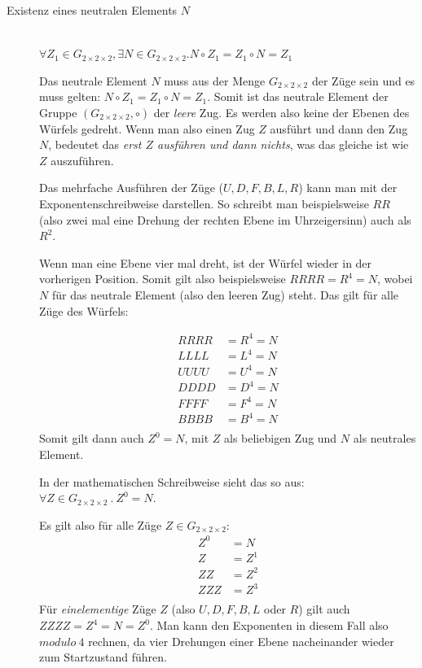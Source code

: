 \documentclass[12pt,a4paper, usenames, dvipsnames]{article}
\newcommand{\Gtwo}{\ensuremath{G_{2\times 2\times 2}}}
\begin{document}
\begin{description}
\item [Existenz eines neutralen Elements $N$] \ \\
$\forall Z_1 \in \Gtwo, \exists N \in \Gtwo.N \circ Z_1 = Z_1 \circ N = Z_1$ 


Das neutrale Element $N$ muss aus der Menge $\Gtwo$ der Züge sein und es muss gelten: $N \circ Z_1 = Z_1 \circ N = Z_1$. Somit ist das neutrale Element der Gruppe $(\Gtwo, \circ)$ der \textit{leere} Zug. Es werden also keine der Ebenen des Würfels gedreht. Wenn man also einen Zug $Z$ ausführt und dann den Zug $N$, bedeutet das \textit{erst $Z$ ausführen und dann nichts}, was das gleiche ist wie $Z$ auszuführen.

Das mehrfache Ausführen der Züge ($U, D, F, B, L, R$) kann man mit der Exponentenschreibweise darstellen. So schreibt man beispielsweise $RR$ (also zwei mal eine Drehung der rechten Ebene im Uhrzeigersinn) auch als $R^2$.

Wenn man eine Ebene vier mal dreht, ist der Würfel wieder in der vorherigen Position. Somit gilt also beispielsweise $RRRR=R^4=N$, wobei $N$ für das neutrale Element (also den leeren Zug) steht. Das gilt für alle Züge des Würfels:

\begin{align*}
RRRR & =R^4 =N \\
LLLL & =L^4 =N \\
UUUU & =U^4 =N \\
DDDD & =D^4 =N \\
FFFF & =F^4 =N \\
BBBB & =B^4 =N \\
\end{align*}
Somit gilt dann auch $Z^0=N$, mit $Z$ als beliebigen Zug und $N$ als neutrales Element. 

In der mathematischen Schreibweise sieht das so aus: $\forall Z \in \Gtwo \ . \ Z^0=N$. 

Es gilt also für alle Züge $Z \in \Gtwo$: 
\begin{align*}
Z^0 & =N \\
Z & =Z^1 \\
ZZ & =Z^2 \\
ZZZ & =Z^3 \\
\end{align*}
Für \textit{einelementige} Züge $Z$ (also $U, D, F, B, L$ oder $R$) gilt auch $ZZZZ =Z^4=N=Z^0$.
Man kann den Exponenten in diesem Fall also $modulo \ 4$ rechnen, da vier Drehungen einer Ebene nacheinander wieder zum Startzustand führen. 



\end{description}
\end{document}
